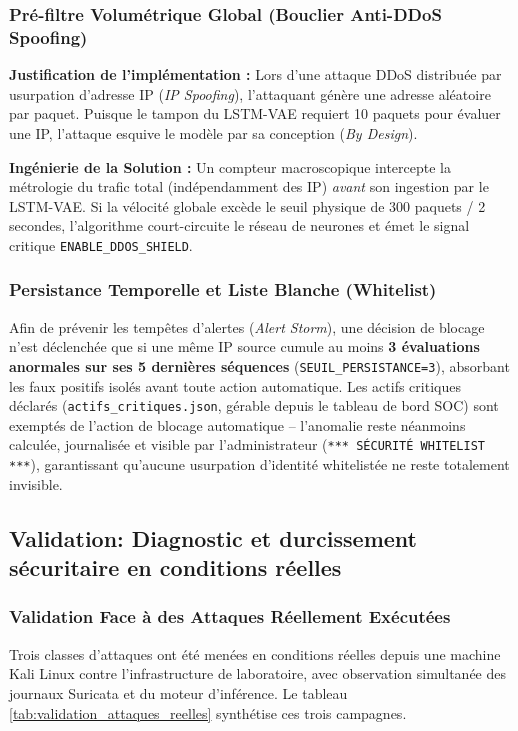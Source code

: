\subsubsection{Pré-filtre Volumétrique Global (Bouclier Anti-DDoS Spoofing)}
\textbf{Justification de l'implémentation :} Lors d'une attaque DDoS distribuée par usurpation d'adresse IP (\textit{IP Spoofing}), l'attaquant génère une adresse aléatoire par paquet. Puisque le tampon du LSTM-VAE requiert 10 paquets pour évaluer une IP, l'attaque esquive le modèle par sa conception (\textit{By Design}).

\textbf{Ingénierie de la Solution :} Un compteur macroscopique intercepte la métrologie du trafic total (indépendamment des IP) \textit{avant} son ingestion par le LSTM-VAE. Si la vélocité globale excède le seuil physique de $300$ paquets / 2 secondes, l'algorithme court-circuite le réseau de neurones et émet le signal critique \texttt{ENABLE\_DDOS\_SHIELD}.

\subsubsection{Persistance Temporelle et Liste Blanche (Whitelist)}
Afin de prévenir les tempêtes d'alertes (\textit{Alert Storm}), une décision de blocage n'est déclenchée que si une même IP source cumule au moins \textbf{3 évaluations anormales sur ses 5 dernières séquences} (\texttt{SEUIL\_PERSISTANCE=3}), absorbant les faux positifs isolés avant toute action automatique. Les actifs critiques déclarés (\texttt{actifs\_critiques.json}, gérable depuis le tableau de bord SOC) sont exemptés de l'action de blocage automatique -- l'anomalie reste néanmoins calculée, journalisée et visible par l'administrateur (\texttt{*** SÉCURITÉ WHITELIST ***}), garantissant qu'aucune usurpation d'identité whitelistée ne reste totalement invisible.

\subsection{Validation: Diagnostic et durcissement sécuritaire en conditions réelles}
\label{subsec:diagnostic_suricata}

\subsubsection{Validation Face à des Attaques Réellement Exécutées}
Trois classes d'attaques ont été menées en conditions réelles depuis une machine Kali Linux contre l'infrastructure de laboratoire, avec observation simultanée des journaux Suricata et du moteur d'inférence. Le tableau \ref{tab:validation_attaques_reelles} synthétise ces trois campagnes.

